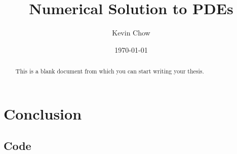 \documentclass{sfuthesis}
\title{Numerical Solution to PDEs}
\author{Kevin Chow}
\date{\today}
\theoremstyle{definition}
\begin{document}
\frontmatter
\maketitle{}
\makecommittee{}

\begin{abstract}
	This is a blank document from which you can start writing your thesis.
\end{abstract}


\begin{dedication} %
\end{dedication}


\begin{acknowledgements} %
\end{acknowledgements}

\tableofcontents\clearpage
{}\listoftables\clearpage
{}\listoffigures





%
%

\mainmatter%










\chapter{Conclusion}

%
%
%
%
%

\backmatter%
	
	

\begin{appendices} %
	\chapter{Code}
\end{appendices}
\end{document}
